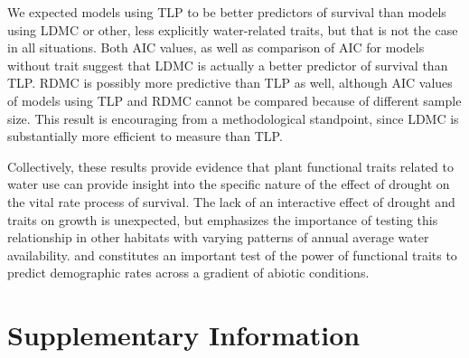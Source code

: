 \documentclass[12pt, letterpaper]{article}
\begin{document}
We expected models using TLP to be better predictors of survival than models using LDMC or other, less explicitly water-related traits, but that is not the case in all situations. Both AIC values, as well as comparison of AIC for models without trait suggest that LDMC is actually a better predictor of survival than TLP. RDMC is possibly more predictive than TLP as well, although AIC values of models using TLP and RDMC cannot be compared because of different sample size. This result is encouraging from a methodological standpoint, since LDMC is substantially more efficient to measure than TLP. 

Collectively, these results provide evidence that plant functional traits related to water use can provide insight into the specific nature of the effect of drought on the vital rate process of survival. The lack of an interactive effect of drought and traits on growth is unexpected, but emphasizes the importance of testing this relationship in other habitats with varying patterns of annual average water availability. and constitutes an important test of the power of functional traits to predict demographic rates across a gradient of abiotic conditions.





\section{Supplementary Information}
\end{document}

